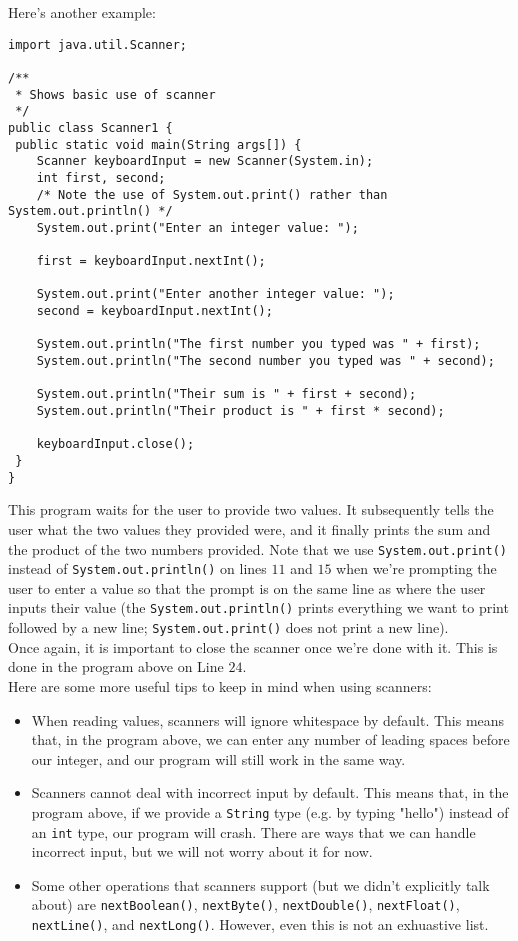 Here's another example:

\begin{lstlisting}
import java.util.Scanner;

/** 
 * Shows basic use of scanner
 */
public class Scanner1 { 
 public static void main(String args[]) {
    Scanner keyboardInput = new Scanner(System.in);
    int first, second;
    /* Note the use of System.out.print() rather than System.out.println() */
    System.out.print("Enter an integer value: ");
    
    first = keyboardInput.nextInt();
    
    System.out.print("Enter another integer value: ");
    second = keyboardInput.nextInt();
    
    System.out.println("The first number you typed was " + first);
    System.out.println("The second number you typed was " + second);
    
    System.out.println("Their sum is " + first + second);
    System.out.println("Their product is " + first * second);
    
    keyboardInput.close();
 }
}
\end{lstlisting}

This program waits for the user to provide two values. It subsequently tells the user what the two values they provided were, and it finally prints the sum and the product of the two numbers provided. Note that we use \verb!System.out.print()! instead of \verb!System.out.println()! on lines $11$ and $15$ when we're prompting the user to enter a value so that the prompt is on the same line as where the user inputs their value (the \verb!System.out.println()! prints everything we want to print followed by a new line; \verb!System.out.print()! does not print a new line). \\  


Once again, it is important to close the scanner once we're done with it. This is done in the program above on Line $24$. \\


Here are some more useful tips to keep in mind when using scanners: 

\begin{itemize}
    \item When reading values, scanners will ignore whitespace by default. This means that, in the program above, we can enter any number of leading spaces before our integer, and our program will still work in the same way.
    \item Scanners cannot deal with incorrect input by default. This means that, in the program above, if we provide a \verb!String! type (e.g. by typing "hello") instead of an \verb!int! type, our program will crash. There are ways that we can handle incorrect input, but we will not worry about it for now. 
    \item Some other operations that scanners support (but we didn't explicitly talk about) are \verb!nextBoolean()!, \verb!nextByte()!, \verb!nextDouble()!, \verb!nextFloat()!, \verb!nextLine()!, and \verb!nextLong()!. However, even this is not an exhuastive list.
\end{itemize}


